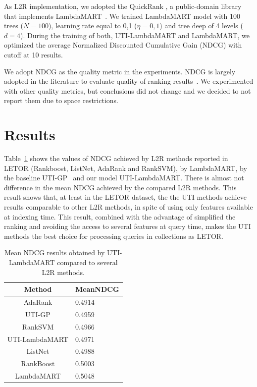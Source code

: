\documentclass[preprint,review,10pt,3p]{elsarticle}
\begin{document}
As L2R implementation,  we adopted the QuickRank \cite{capannini2016quality}, a public-domain library that implements LambdaMART~\cite{wu2010lambdamart}. We trained LambdaMART model with 100 trees ($N=100$), learning rate equal to 0,1 ($\eta=0,1$) and tree deep of 4 levels ($d=4$). During the training of both, UTI-LambdaMART and LambdaMART, we optimized the average Normalized Discounted Cumulative Gain (NDCG) with cutoff at 10 results.
 
 We adopt NDCG as the quality metric in the experiments. NDCG is  largely adopted in the literature to evaluate quality of ranking results~\cite{baezaribeiro2011modinforet}. We experimented with other quality metrics, but conclusions did not change and we decided to not report them due to space restrictions. 

\section{Results}
\label{results}

 Table~\ref{tab:baseline} shows the values of NDCG  achieved by L2R methods reported in LETOR (Rankboost, ListNet, AdaRank and RankSVM), by  LambdaMART,  by the  baseline UTI-GP~\cite{costa2012lepref} and our model UTI-LambdaMART. There is almost not difference in the mean NDCG achieved by the compared L2R methods. This result shows that, at least in the LETOR dataset, the the UTI methods achieve results comparable to other L2R methods, in spite of using only features available at indexing time. This result, combined with the advantage of simplified the ranking and avoiding the access to several features at query time, makes the UTI methods the best choice for processing queries in collections as LETOR.

\begin{table}
\caption{Mean NDCG  results obtained by UTI-LambdaMART compared to several L2R methods.}
\label{tab:baseline}
\begin{center}
\begin{tabular}{|c|l|}
 \hline
 \textbf{Method} & \textbf{MeanNDCG} \\ 
 \hline\hline
 AdaRank & 0.4914 \\
 \hline
 UTI-GP & 0.4959 \\ 
 \hline
 RankSVM & 0.4966  \\ 
 \hline
 UTI-LambdaMART & 0.4971 \\ 
 \hline
 ListNet & 0.4988 \\
 \hline
 RankBoost & 0.5003 \\
 \hline
 LambdaMART & 0.5048 \\ 
 \hline
\end{tabular}
\end{center}
\end{table}
\end{document}

